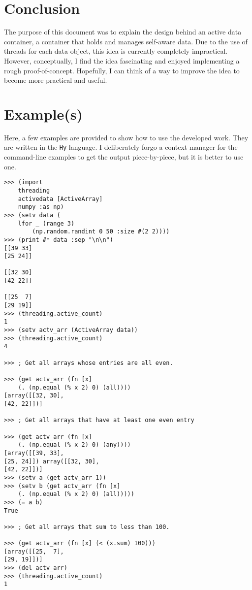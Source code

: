 \documentclass[10pt]{article}
\begin{document}
\section{Conclusion}
	The purpose of this document was to explain the design behind an active data container, a container that holds and manages self-aware data. Due to the use of threads for each data object, this idea is currently completely impractical. However, conceptually, I find the idea fascinating and enjoyed implementing a rough proof-of-concept. Hopefully, I can think of a way to improve the idea to become more practical and useful. 
\newpage
\appendix
\section{Example(s)}
	Here, a few examples are provided to show how to use the developed work. They are written in the \lstinline|Hy| language. I deliberately forgo a context manager for the command-line examples to get the output piece-by-piece, but it is better to use one.
	
\begin{lstlisting}
>>> (import
	threading
	activedata [ActiveArray]
	numpy :as np)
>>> (setv data (
	lfor _ (range 3) 
		(np.random.randint 0 50 :size #(2 2))))
>>> (print #* data :sep "\n\n")
[[39 33]
[25 24]]

[[32 30]
[42 22]]

[[25  7]
[29 19]]
>>> (threading.active_count)
1
>>> (setv actv_arr (ActiveArray data))
>>> (threading.active_count)
4

>>> ; Get all arrays whose entries are all even.

>>> (get actv_arr (fn [x]
	(. (np.equal (% x 2) 0) (all))))
[array([[32, 30],
[42, 22]])]

>>> ; Get all arrays that have at least one even entry

>>> (get actv_arr (fn [x]
	(. (np.equal (% x 2) 0) (any))))
[array([[39, 33],
[25, 24]]) array([[32, 30],
[42, 22]])]	
>>> (setv a (get actv_arr 1))
>>> (setv b (get actv_arr (fn [x]
	(. (np.equal (% x 2) 0) (all)))))
>>> (= a b)
True

>>> ; Get all arrays that sum to less than 100.

>>> (get actv_arr (fn [x] (< (x.sum) 100)))
[array([[25,  7],
[29, 19]])]
>>> (del actv_arr)
>>> (threading.active_count)
1
\end{lstlisting}
\end{document}
